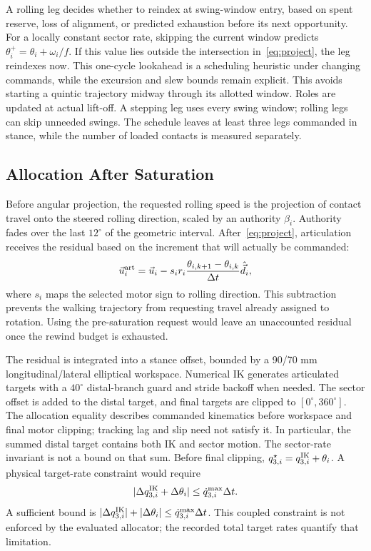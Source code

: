 \documentclass[letterpaper,10pt,conference]{ieeeconf}
\newcommand{\vct}[1]{\vec{#1}}
\begin{document}
A rolling leg decides whether to reindex at swing-window entry, based on spent reserve, loss of alignment, or predicted exhaustion before its next opportunity. For a locally constant sector rate, skipping the current window predicts $\theta_i^+=\theta_i+\omega_i/f$. If this value lies outside the intersection in~\eqref{eq:project}, the leg reindexes now. This one-cycle lookahead is a scheduling heuristic under changing commands, while the excursion and slew bounds remain explicit. This avoids starting a quintic trajectory midway through its allotted window. Roles are updated at actual lift-off. A stepping leg uses every swing window; rolling legs can skip unneeded swings. The schedule leaves at least three legs commanded in stance, while the number of loaded contacts is measured separately.

\subsection{Allocation After Saturation}
Before angular projection, the requested rolling speed is the projection of contact travel onto the steered rolling direction, scaled by an authority $\beta_i$. Authority fades over the last $12^\circ$ of the geometric interval. After~\eqref{eq:project}, articulation receives the residual based on the increment that will actually be commanded:
\begin{equation}
 \vct{u}^{\rm art}_i=\vct{u}_i-
 s_i r_i\frac{\theta_{i,k+1}-\theta_{i,k}}{\Delta t}\hat{\vct{d}}_i,\label{eq:residual}
\end{equation}
where $s_i$ maps the selected motor sign to rolling direction. This subtraction prevents the walking trajectory from requesting travel already assigned to rotation. Using the pre-saturation request would leave an unaccounted residual once the rewind budget is exhausted.

The residual is integrated into a stance offset, bounded by a 90/70 mm longitudinal/lateral elliptical workspace. Numerical IK generates articulated targets with a $40^\circ$ distal-branch guard and stride backoff when needed. The sector offset is added to the distal target, and final targets are clipped to $[0^\circ,360^\circ]$. The allocation equality describes commanded kinematics before workspace and final motor clipping; tracking lag and slip need not satisfy it. In particular, the summed distal target contains both IK and sector motion. The sector-rate invariant is not a bound on that sum. Before final clipping, $q^\star_{3,i}=q^{\rm IK}_{3,i}+\theta_i$. A physical target-rate constraint would require
\begin{equation}
 |\Delta q^{\rm IK}_{3,i}+\Delta\theta_i|\le\dot q_{3,i}^{\max}\Delta t.\label{eq:joint}
\end{equation}
A sufficient bound is $|\Delta q^{\rm IK}_{3,i}|+|\Delta\theta_i|\le\dot q_{3,i}^{\max}\Delta t$. This coupled constraint is not enforced by the evaluated allocator; the recorded total target rates quantify that limitation.
\end{document}
